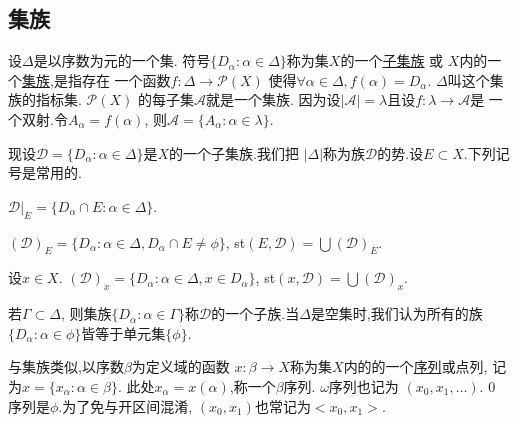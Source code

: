 \documentclass[main.tex]{subfiles}
\begin{document}
\subsection{集族}\label{ch1.1.1}
设$\Delta$是以序数为元的一个集.
符号$\{D_\alpha : \alpha\in\Delta\}$称为集$X$的一个\underline{子集族} 或
$X$内的一个\underline{集族},是指存在
一个函数$f:\Delta \to \mathscr{P}(X)$
使得$\forall \alpha \in \Delta, f(\alpha)=D_\alpha$.
$\Delta$叫这个集族的指标集. $\mathscr{P}(X)$
的每子集$\mathscr{A}$就是一个集族.
因为设$|\mathscr{A}|=\lambda$且设$f: \lambda\to \mathscr{A}$是
一个双射.令$A_\alpha = f(\alpha)$, 则$\mathscr{A}=\{A_\alpha:\alpha\in\lambda\}$.

现设$\mathscr{D}=\{D_\alpha:\alpha\in\Delta\}$是$X$的一个子集族.我们把
$|\Delta|$称为族$\mathscr{D}$的势.设$E\subset X$.下列记号是常用的.

$\mathscr{D}|_E= \{D_\alpha\cap E: \alpha\in\Delta\}$.

$(\mathscr{D})_E= \{D_\alpha: \alpha\in\Delta, D_\alpha\cap E \ne\phi\}$,
st$(E, \mathscr{D}) = \bigcup(\mathscr{D})_E$.

设$x\in X$. $(\mathscr{D})_x= \{D_\alpha: \alpha\in\Delta, x\in D_\alpha\}$,
st$(x, \mathscr{D}) = \bigcup(\mathscr{D})_x$.

若$\Gamma\subset\Delta$, 则集族$\{D_\alpha : \alpha\in\Gamma\}$称$\mathscr{D}$的一个子族.当$\Delta$是空集时,我们认为所有的族$\{D_\alpha : \alpha\in\phi\}$皆等于单元集$\{\phi\}$.

与集族类似,以序数$\beta$为定义域的函数
$x: \beta\to X$称为集$X$内的的一个\underline{序列}或点列, 记为$x=\{x_\alpha : \alpha\in\beta\}$.
此处$x_\alpha=x(\alpha)$,称一个$\beta$序列. $\omega$序列也记为
$(x_0, x_1, \dots)$. 0 序列是$\phi$.为了免与开区间混淆, $(x_0, x_1)$也常记为$<x_0, x_1>$.

\end{document}
